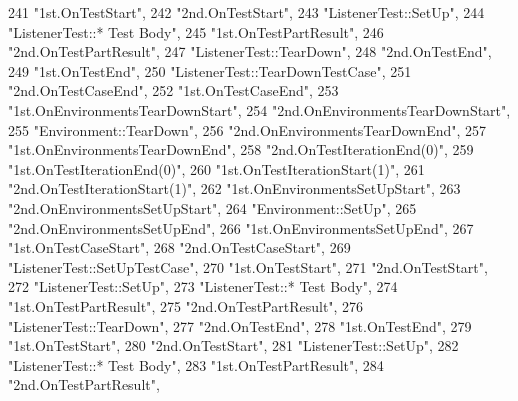 \begin{DoxyCode}
241     \textcolor{stringliteral}{"1st.OnTestStart"},
242     \textcolor{stringliteral}{"2nd.OnTestStart"},
243     \textcolor{stringliteral}{"ListenerTest::SetUp"},
244     \textcolor{stringliteral}{"ListenerTest::* Test Body"},
245     \textcolor{stringliteral}{"1st.OnTestPartResult"},
246     \textcolor{stringliteral}{"2nd.OnTestPartResult"},
247     \textcolor{stringliteral}{"ListenerTest::TearDown"},
248     \textcolor{stringliteral}{"2nd.OnTestEnd"},
249     \textcolor{stringliteral}{"1st.OnTestEnd"},
250     \textcolor{stringliteral}{"ListenerTest::TearDownTestCase"},
251     \textcolor{stringliteral}{"2nd.OnTestCaseEnd"},
252     \textcolor{stringliteral}{"1st.OnTestCaseEnd"},
253     \textcolor{stringliteral}{"1st.OnEnvironmentsTearDownStart"},
254     \textcolor{stringliteral}{"2nd.OnEnvironmentsTearDownStart"},
255     \textcolor{stringliteral}{"Environment::TearDown"},
256     \textcolor{stringliteral}{"2nd.OnEnvironmentsTearDownEnd"},
257     \textcolor{stringliteral}{"1st.OnEnvironmentsTearDownEnd"},
258     \textcolor{stringliteral}{"2nd.OnTestIterationEnd(0)"},
259     \textcolor{stringliteral}{"1st.OnTestIterationEnd(0)"},
260     \textcolor{stringliteral}{"1st.OnTestIterationStart(1)"},
261     \textcolor{stringliteral}{"2nd.OnTestIterationStart(1)"},
262     \textcolor{stringliteral}{"1st.OnEnvironmentsSetUpStart"},
263     \textcolor{stringliteral}{"2nd.OnEnvironmentsSetUpStart"},
264     \textcolor{stringliteral}{"Environment::SetUp"},
265     \textcolor{stringliteral}{"2nd.OnEnvironmentsSetUpEnd"},
266     \textcolor{stringliteral}{"1st.OnEnvironmentsSetUpEnd"},
267     \textcolor{stringliteral}{"1st.OnTestCaseStart"},
268     \textcolor{stringliteral}{"2nd.OnTestCaseStart"},
269     \textcolor{stringliteral}{"ListenerTest::SetUpTestCase"},
270     \textcolor{stringliteral}{"1st.OnTestStart"},
271     \textcolor{stringliteral}{"2nd.OnTestStart"},
272     \textcolor{stringliteral}{"ListenerTest::SetUp"},
273     \textcolor{stringliteral}{"ListenerTest::* Test Body"},
274     \textcolor{stringliteral}{"1st.OnTestPartResult"},
275     \textcolor{stringliteral}{"2nd.OnTestPartResult"},
276     \textcolor{stringliteral}{"ListenerTest::TearDown"},
277     \textcolor{stringliteral}{"2nd.OnTestEnd"},
278     \textcolor{stringliteral}{"1st.OnTestEnd"},
279     \textcolor{stringliteral}{"1st.OnTestStart"},
280     \textcolor{stringliteral}{"2nd.OnTestStart"},
281     \textcolor{stringliteral}{"ListenerTest::SetUp"},
282     \textcolor{stringliteral}{"ListenerTest::* Test Body"},
283     \textcolor{stringliteral}{"1st.OnTestPartResult"},
284     \textcolor{stringliteral}{"2nd.OnTestPartResult"},

\end{DoxyCode}
